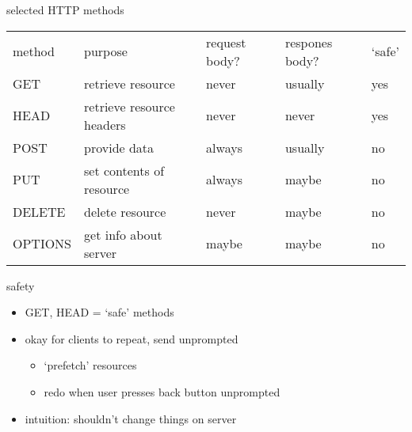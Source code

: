 \begin{frame}{selected HTTP methods}
\small
\begin{tabular}{lllll}
method & purpose & request body? & respones body? & `safe' \\
GET & retrieve resource & never & usually & yes \\
HEAD & retrieve resource headers& never & never & yes \\
POST & provide data & always & usually & no \\
PUT & set contents of resource & always & maybe & no \\
DELETE & delete resource & never & maybe & no \\
OPTIONS & get info about server & maybe & maybe & no \\
\end{tabular}
\end{frame}

\begin{frame}{safety}
    \begin{itemize}
    \item GET, HEAD = `safe' methods
    \item okay for clients to repeat, send unprompted
        \begin{itemize}
        \item `prefetch' resources
        \item redo when user presses back button unprompted
        \end{itemize}
    \item intuition: shouldn't change things on server
    \end{itemize}
\end{frame}
